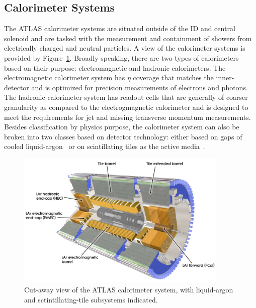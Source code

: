 \subsection{Calorimeter Systems}
\label{sec:calorimeters}

The ATLAS calorimeter systems are situated outside of the ID and central solenoid and
are tasked with the measurement and containment of showers from electrically charged and neutral particles.
A view of the calorimeter systems is provided by Figure~\ref{fig:atlas_calorimeters_cutaway}.
Broadly speaking, there are two types of calorimeters based on their purpose:
electromagnetic and hadronic calorimeters.
The electromagnetic calorimeter system has $\eta$ coverage that matches the inner-detector
and is optimized for precision measurements of electrons and photons.
The hadronic calorimeter system has readout cells that are generally of
coarser granularity as compared to the electrogmagnetic calorimeter and
is designed to meet the requirements for jet and missing transverse momentum
measurements.
Besides classification by physics purpose, the calorimeter system can also
be broken into two classes based on detector technology: either based
on gaps of cooled liquid-argon~\cite{CERN-LHCC-96-041} or on scintillating tiles as the active media~\cite{CERN-LHCC-96-042}.

\begin{figure}[!htb]
    \begin{center}
        \includegraphics[width=0.9\textwidth]{figures/chapter2/calorimeters/atlas_calorimeter_cutaway}
        \caption{
            Cut-away view of the ATLAS calorimeter system, with liquid-argon and sctintillating-tile
            subsystems indicated.
        }
        \label{fig:atlas_calorimeters_cutaway}
    \end{center}
\end{figure}


